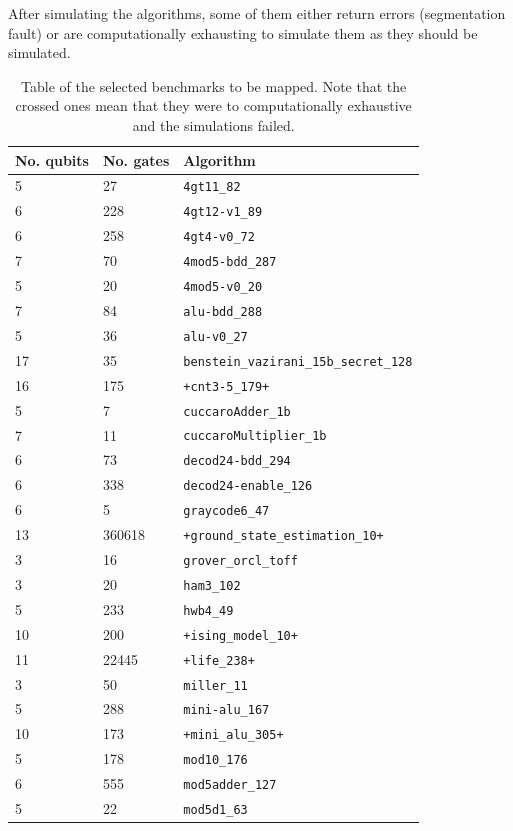 After simulating the algorithms, some of them either return errors (segmentation fault) or are computationally exhausting to simulate them as they should be simulated.

\begin{table}[htbp]
\caption{\label{tab:orgcc7fb20}
Table of the selected benchmarks to be mapped. Note that the crossed ones mean that they were to computationally exhaustive and the simulations failed.}
\centering
\begin{tabular}{lll}
\hline
No. qubits & No. gates & Algorithm\\
\hline
5 & 27 & \texttt{4gt11\_82}\\
6 & 228 & \texttt{4gt12-v1\_89}\\
6 & 258 & \texttt{4gt4-v0\_72}\\
7 & 70 & \texttt{4mod5-bdd\_287}\\
5 & 20 & \texttt{4mod5-v0\_20}\\
7 & 84 & \texttt{alu-bdd\_288}\\
5 & 36 & \texttt{alu-v0\_27}\\
17 & 35 & \texttt{benstein\_vazirani\_15b\_secret\_128}\\
16 & 175 & \texttt{+cnt3-5\_179+}\\
5 & 7 & \texttt{cuccaroAdder\_1b}\\
7 & 11 & \texttt{cuccaroMultiplier\_1b}\\
6 & 73 & \texttt{decod24-bdd\_294}\\
6 & 338 & \texttt{decod24-enable\_126}\\
6 & 5 & \texttt{graycode6\_47}\\
13 & 360618 & \texttt{+ground\_state\_estimation\_10+}\\
3 & 16 & \texttt{grover\_orcl\_toff}\\
3 & 20 & \texttt{ham3\_102}\\
5 & 233 & \texttt{hwb4\_49}\\
10 & 200 & \texttt{+ising\_model\_10+}\\
11 & 22445 & \texttt{+life\_238+}\\
3 & 50 & \texttt{miller\_11}\\
5 & 288 & \texttt{mini-alu\_167}\\
10 & 173 & \texttt{+mini\_alu\_305+}\\
5 & 178 & \texttt{mod10\_176}\\
6 & 555 & \texttt{mod5adder\_127}\\
5 & 22 & \texttt{mod5d1\_63}\\

\end{tabular}
\end{table}
